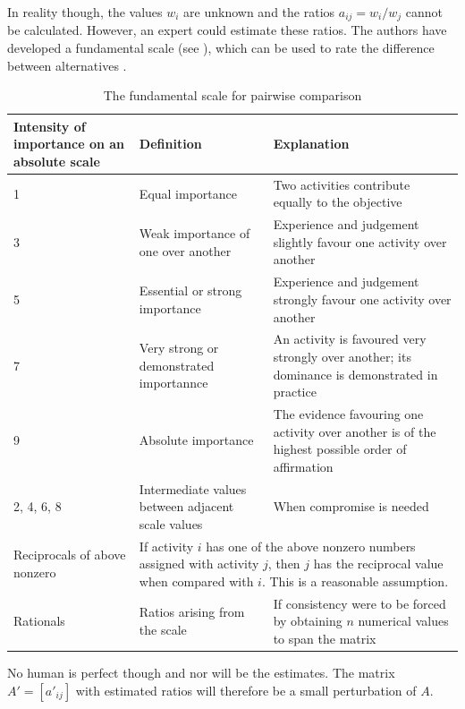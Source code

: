 In reality though, the values $w_i$ are unknown and the ratios $a_{ij} = w_i/w_j$ cannot be calculated. However, an expert could estimate these ratios. The authors have developed a fundamental scale (see ), which can be used to rate the difference between alternatives \cite{Saaty:1990}.

\begin{table}
    \begin{center}
        \begin{tabular}{p{2.5cm}p{4cm}p{6cm}}
            \hline
            Intensity of importance on an absolute scale & Definition & Explanation \\
            \hline
            1 & Equal importance & Two activities contribute equally to the objective \\
            3 & Weak importance of one over another & Experience and judgement slightly favour one activity over another \\
            5 & Essential or strong importance & Experience and judgement strongly favour one activity over another \\
            7 & Very strong or demonstrated importannce & An activity is favoured very strongly over another; its dominance is  demonstrated in practice \\
            9 & Absolute importance & The evidence favouring one activity over another is of the highest possible order of affirmation \\
            2, 4, 6, 8 & Intermediate values between adjacent scale values & When compromise is needed \\
            Reciprocals of above nonzero & \multicolumn{2}{p{10cm}}{If activity $i$ has one of the above nonzero numbers assigned with activity $j$, then $j$ has the reciprocal value when compared with $i$. This is a reasonable assumption.} \\
            Rationals & Ratios arising from the scale & If consistency were to be forced by obtaining $n$ numerical values to span the matrix \\
            \hline
        \end{tabular}
        \caption{The fundamental scale for pairwise comparison\cite{Saaty:1990}}
        \label{tab:ahp-scale}
    \end{center}
\end{table}

No human is perfect though and nor will be the estimates. The matrix $A' = \left[a'_{ij}\right]$ with estimated ratios will therefore be a small perturbation of $A$. 

